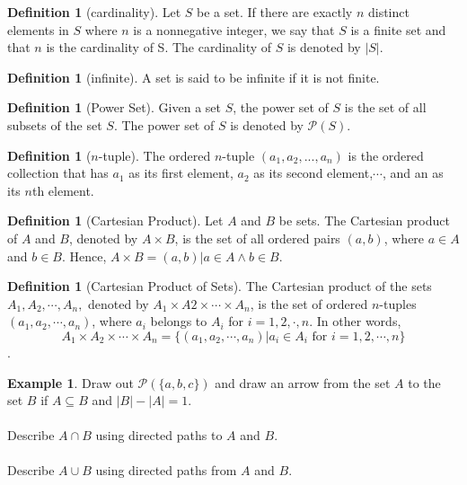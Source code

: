 \documentclass[letterpaper,10pt]{article}
\theoremstyle{plain}
\theoremstyle{definition}
\newtheorem{defn}[thm]{Definition}
\newtheorem{exmp}[thm]{Example}
\theoremstyle{remark}
\providecommand{\land}{\ensuremath{\wedge}}
\providecommand{\card}[1]{\ensuremath{\left\lvert#1\right\rvert}}
\begin{document}
\begin{defn}[cardinality]
Let $S$ be a set. If there are exactly $n$ distinct elements in $S$ where $n$ is a nonnegative integer,
we say that $S$ is a finite set and that $n$ is the cardinality of S. The cardinality of $S$ is denoted
by $\card{S}$.
\end{defn}
\begin{defn}[infinite]
A set is said to be infinite if it is not finite.
\end{defn}
\begin{defn}[Power Set]
Given a set $S$, the power set of $S$ is the set of all subsets of the set $S$. The power set of $S$ is
denoted by $\mathcal{P}(S)$.
\end{defn}
\begin{defn}[$n$-tuple]
The ordered $n$-tuple $(a_1, a_2, . . . , a_n)$ is the ordered collection that has $a_1$ as its first element,
$a_2$ as its second element,$\cdots$, and an as its $n$th element.
\end{defn}
\begin{defn}[Cartesian Product]
Let $A$ and $B$ be sets. The Cartesian product of $A$ and $B$, denoted by $A \times B$, is the set of all
ordered pairs $(a, b)$, where $a \in A$ and $b \in B$. Hence,
$A \times B = {(a, b) | a \in A \land b \in B}$.
\end{defn}
\begin{defn}[Cartesian Product of Sets]
The Cartesian product of the sets $A_1,A_2, \cdots , A_n,$ denoted by $A_1 \times A2 \times \cdots \times A_n$, is the
set of ordered $n$-tuples $(a_1, a_2, \cdots , a_n)$, where $a_i$ belongs to $A_i$ for $i = 1, 2, \cdot , n$. In other
words,
\[A_1 \times A_2 \times \cdots \times A_n = \{(a_1, a_2, \cdots , a_n) | a_i \in A_i \text{ for }i = 1, 2,\cdots, n\}\].
\end{defn}
\begin{exmp}
Draw out $\mathcal{P}(\{a,b,c\})$ and draw an arrow from the set  $A$ to the set $B$ if $A\subseteq B$ and $\card{B}-\card{A}=1$.\\
\vspace{2cm}\\
Describe $A\cap B$ using directed paths to $A$ and $B$.\\
\vspace{1cm}\\
Describe $A\cup B$ using directed paths from $A$ and $B$.\\
\vspace{1cm}\\

\end{exmp}
\end{document}
